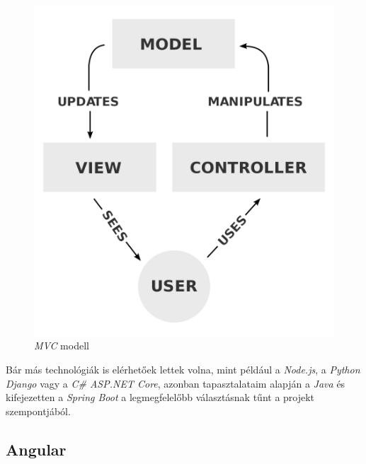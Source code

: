 \begin{figure}[h]
\centering
\includegraphics[scale=0.15]{images/MVC.png}
\caption{\textit{MVC} modell \cite{mvc}}
\label{fig:mvc}
\end{figure}

Bár más technológiák is elérhetőek lettek volna, mint például a \textit{Node.js}, a \textit{Python} \textit{Django} vagy a \textit{C\# ASP.NET Core}, azonban tapasztalataim alapján a \textit{Java} \cite{java} és kifejezetten a \textit{Spring Boot} \cite{spring_boot} a legmegfelelőbb választásnak tűnt a projekt szempontjából.

\subsection{\textbf{Angular}}

